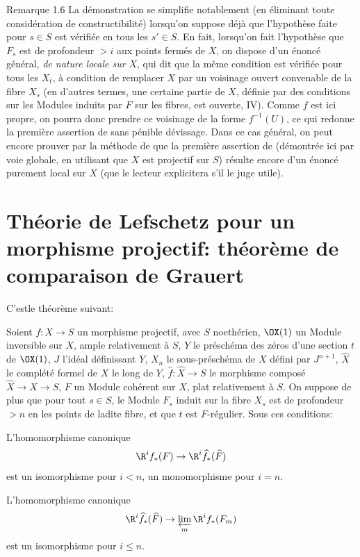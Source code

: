 \label{XII.1.6}
\begin{enonce*}[remark]{Remarque 1.6\sfootnotemark}  La d\'emonstration se simplifie notablement (en \'eliminant toute consid\'eration de constructibilit\'e) lorsqu'on suppose d\'ej\`a que l'hypoth\`ese faite pour $s\in S$ est v\'erifi\'ee en tous les $s'\in S$. En fait, lorsqu'on fait l'hypoth\`ese que $F_s$ est de profondeur $>i$ aux points ferm\'es de $X$, on dispose d'un \'enonc\'e g\'en\'eral, \emph{de nature locale sur} $X$, qui dit que la m\^eme condition est v\'erifi\'ee pour tous les $X_t$, \`a condition de remplacer $X$ par un voisinage ouvert convenable de la fibre $X_s$ (en d'autres termes, une certaine partie de $X$, d\'efinie par des conditions sur les Modules induits par $F$ sur les fibres, est ouverte, \cf \EGA IV). Comme $f$ est ici propre, on pourra donc prendre ce voisinage de la forme $f^{-1}(U)$, ce qui redonne la premi\`ere assertion de  sans p\'enible d\'evissage. Dans ce cas g\'en\'eral, on peut encore prouver par la m\'ethode de \loccit que la premi\`ere assertion de  (d\'emontr\'ee ici par voie globale, en utilisant que $X$ est projectif sur $S$) r\'esulte encore d'un \'enonc\'e purement local sur $X$ (que le lecteur explicitera s'il le juge utile).
\end{enonce*}

\section[Th\'eorie de Lefschetz pour un morphisme projectif: comparaison]
{Th\'eorie de Lefschetz pour un morphisme projectif: th\'eor\`eme de comparaison de Grauert} \label{XII.2}

\setcounter{equation}{13}
C'est\pageoriginale le th\'eor\`eme suivant:

\begin{theoreme} \label{XII.2.1}
Soient $f:X\to S$ un morphisme projectif, avec $S$ noeth\'erien, $\OX(1)$ un Module inversible sur $X$, ample relativement \`a $S$, $Y$ le pr\'esch\'ema des z\'eros d'une section $t$ de $\OX(1)$, $J$ l'id\'eal d\'efinissant $Y$, $X_n$ le sous-pr\'esch\'ema de $X$ d\'efini par $J^{n+1}$, $\widehat{X}$ le compl\'et\'e formel de $X$ le long de $Y$, $\widehat{f}:\widehat{X}\to S$ le morphisme compos\'e $\widehat{X}\to X\to S$, $F$ un Module coh\'erent sur $X$, plat relativement \`a $S$. On suppose de plus que pour tout $s\in S$, le Module $F_s$ induit sur la fibre $X_s$ est de profondeur $>n$ en les points de ladite fibre, et que $t$ est $F$-r\'egulier. Sous ces conditions:
\begin{enumeratei}
\item
L'homomorphisme canonique
\[
\R^if_\ast(F) \to \R^i\widehat{f}_\ast(\widehat{F})
\]
est un isomorphisme pour $i<n$, un monomorphisme pour $i=n$.
\item
L'homomorphisme canonique
\[
\R^i\widehat{f}_\ast(\widehat{F}) \to \varprojlim_m \R^if_\ast(F_m)
\]
est un isomorphisme pour $i\leq n$.
\end{enumeratei}
\end{theoreme}

